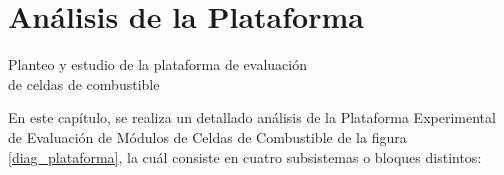 \section{Análisis de la Plataforma} \label{analisis}
\thispagestyle{plain}

\vspace{0.5cm}

\Large\scshape
\begin{center}
    {\Medium Planteo y estudio de la plataforma de evaluación\\ de celdas de combustible}
\end{center}
\normalfont

\divider

En este capítulo, se realiza un detallado análisis de la Plataforma Experimental de Evaluación de Módulos de Celdas de Combustible de la figura \ref{diag_plataforma}, la cuál consiste en cuatro subsistemas o bloques distintos: 

